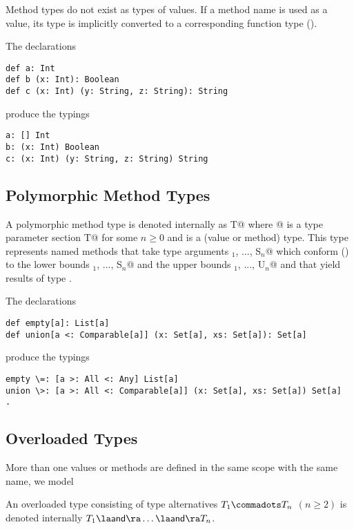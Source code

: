 \documentclass[11pt]{report}
\begin{document}
Method types do not exist as types of values. If a method name is used
as a value, its type is implicitly converted to a corresponding
function type ().

\example The declarations
\begin{verbatim}
def a: Int
def b (x: Int): Boolean
def c (x: Int) (y: String, z: String): String
\end{verbatim}
produce the typings
\begin{verbatim}
a: [] Int
b: (x: Int) Boolean
c: (x: Int) (y: String, z: String) String
\end{verbatim}

\subsection{Polymorphic Method Types}
\label{sec:poly-types}

A polymorphic method type is denoted internally as \verb@[tps]T@ where
\verb@[tps]@ is a type parameter section 
\verb@[a$_1$ <: L$_1$ >: U$_1$, ..., a$_n$ <: L$_n$ >: U$_n$] T@ 
for some $n \geq 0$ and \verb@T@ is a
(value or method) type.  This type represents named methods that
take type arguments \verb@S$_1$, ..., S$_n$@ which
conform () to the lower bounds
\verb@S$_1$, ..., S$_n$@ and the upper bounds
\verb@U$_1$, ..., U$_n$@ and that yield results of type \verb@T@.

\example The declarations
\begin{verbatim}
def empty[a]: List[a]
def union[a <: Comparable[a]] (x: Set[a], xs: Set[a]): Set[a]
\end{verbatim}
produce the typings
\begin{verbatim}
empty \=: [a >: All <: Any] List[a]
union \>: [a >: All <: Comparable[a]] (x: Set[a], xs: Set[a]) Set[a]  .
\end{verbatim}

\subsection{Overloaded Types}
\label{sec:overloaded-types}
\newcommand{\overload}{\la\mbox{\sf and}\ra}


More than one values or methods are defined in the same scope with the
same name, we model

An overloaded type consisting of type alternatives $T_1 \commadots
T_n$ $(n \geq 2)$ is denoted internally $T_1 \overload \ldots
\overload T_n$.
\end{document}
